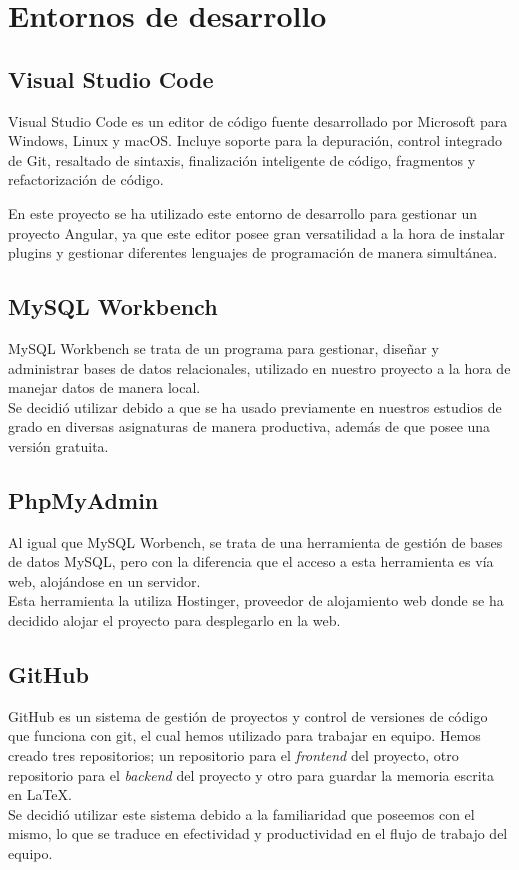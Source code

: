      \section{Entornos de desarrollo}
     
     \subsection{Visual Studio Code}
     Visual Studio Code\cite{vsc} es un editor de código fuente desarrollado por Microsoft para Windows, Linux y macOS. Incluye soporte para la depuración, control integrado de Git, resaltado de sintaxis, finalización inteligente de código, fragmentos y refactorización de código.
    \newline
    
    En este proyecto se ha utilizado este entorno de desarrollo para gestionar un proyecto Angular, ya que este editor posee gran versatilidad a la hora de instalar plugins y gestionar diferentes lenguajes de programación de manera simultánea.
    
     \subsection{MySQL Workbench}
     MySQL Workbench\cite{mysql} se trata de un programa para gestionar, diseñar y administrar bases de datos relacionales, utilizado en nuestro proyecto a la hora de manejar datos de manera local. \\
     \newline
     Se decidió utilizar debido a que se ha usado previamente en nuestros estudios de grado en diversas asignaturas de manera productiva, además de que posee una versión gratuita.
     
     \subsection{PhpMyAdmin}
     Al igual que MySQL Worbench, se trata de una herramienta de gestión de bases de datos MySQL, pero con la diferencia que el acceso a esta herramienta es vía web, alojándose en un servidor.\\
     \newline
     Esta herramienta la utiliza Hostinger\cite{hostinger},  proveedor de alojamiento web donde se ha decidido alojar el proyecto para desplegarlo en la web.
     
     \subsection{GitHub}
     GitHub\cite{github} es un sistema de gestión de proyectos y control de versiones de código que funciona con git, el cual hemos utilizado para trabajar en equipo. Hemos creado tres repositorios; un repositorio para el \textit{frontend} del proyecto, otro repositorio para el \textit{backend} del proyecto y otro para guardar la memoria escrita en \LaTeX . \\
     \newline
     Se decidió utilizar este sistema debido a la familiaridad que poseemos con el mismo, lo que se traduce en efectividad y productividad en el flujo de trabajo del equipo.

